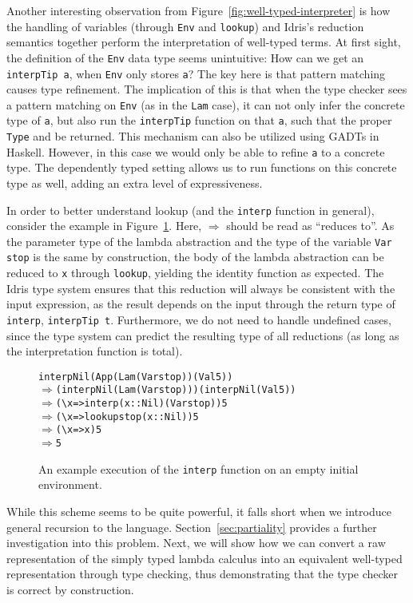 Another interesting observation from Figure~\ref{fig:well-typed-interpreter} is how the handling of variables (through \texttt{Env} and \texttt{lookup}) and Idris's reduction semantics together perform the interpretation of well-typed terms. At first sight, the definition of the \texttt{Env} data type seems unintuitive: How can we get an \texttt{interpTip a}, when \texttt{Env} only stores \texttt{a}? The key here is that pattern matching causes type refinement. The implication of this is that when the type checker sees a pattern matching on \texttt{Env} (as in the \texttt{Lam} case), it can not only infer the concrete type of \texttt{a}, but also run the \texttt{interpTip} function on that \texttt{a}, such that the proper \texttt{Type} and be returned. This mechanism can also be utilized using GADTs in Haskell. However, in this case we would only be able to refine \texttt{a} to a concrete type. The dependently typed setting allows us to run functions on this concrete type as well, adding an extra level of expressiveness.

In order to better understand lookup (and the \texttt{interp} function in general), consider the example in Figure~\ref{fig:well-typed-interpreter-example}. Here, $\Rightarrow$ should be read as ``reduces to''. As the parameter type of the lambda abstraction and the type of the variable \texttt{Var stop} is the same by construction, the body of the lambda abstraction can be reduced to \texttt{x} through \texttt{lookup}, yielding the identity function as expected. The Idris type system ensures that this reduction will always be consistent with the input expression, as the result depends on the input through the return type of \texttt{interp}, \texttt{interpTip t}. Furthermore, we do not need to handle undefined cases, since the type system can predict the resulting type of all reductions (as long as the interpretation function is total).

\begin{figure}
\begin{alltt}
interp Nil (App (Lam (Var stop)) (Val 5))
\(\Rightarrow\) (interp Nil (Lam (Var stop))) (interp Nil (Val 5))
\(\Rightarrow\) (\textbackslash{x} => interp (x :: Nil) (Var stop)) 5
\(\Rightarrow\) (\textbackslash{x} => lookup stop (x :: Nil)) 5
\(\Rightarrow\) (\textbackslash{x} => x) 5
\(\Rightarrow\) 5
\end{alltt}
\caption{An example execution of the \texttt{interp} function on an empty initial environment.}
\label{fig:well-typed-interpreter-example}
\end{figure}

While this scheme seems to be quite powerful, it falls short when we introduce general recursion to the language. Section~\ref{sec:partiality} provides a further investigation into this problem. Next, we will show how we can convert a raw representation of the simply typed lambda calculus into an equivalent well-typed representation through type checking, thus demonstrating that the type checker is correct by construction.
